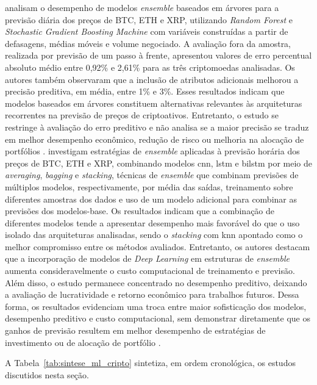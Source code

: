  analisam o desempenho de modelos \textit{ensemble} baseados em árvores para a previsão diária dos preços de BTC, ETH e XRP, utilizando \textit{Random Forest} e \textit{Stochastic Gradient Boosting Machine} com variáveis construídas a partir de defasagens, médias móveis e volume negociado. A avaliação fora da amostra, realizada por previsão de um passo à frente, apresentou valores de erro percentual absoluto médio entre 0,92\% e 2,61\% para as três criptomoedas analisadas. Os autores também observaram que a inclusão de atributos adicionais melhorou a precisão preditiva, em média, entre 1\% e 3\%. Esses resultados indicam que modelos baseados em árvores constituem alternativas relevantes às arquiteturas recorrentes na previsão de preços de criptoativos. Entretanto, o estudo se restringe à avaliação do erro preditivo e não analisa se a maior precisão se traduz em melhor desempenho econômico, redução de risco ou melhoria na alocação de portfólios \cite{derbentsev2021comparative}.  investigam estratégias de \textit{ensemble} aplicadas à previsão horária dos preços de BTC, ETH e XRP, combinando modelos \acs{cnn}, \acs{lstm} e \acs{bilstm} por meio de \textit{averaging}, \textit{bagging} e \textit{stacking}, técnicas de \textit{ensemble} que combinam previsões de múltiplos modelos, respectivamente, por média das saídas, treinamento sobre diferentes amostras dos dados e uso de um modelo adicional para combinar as previsões dos modelos-base. Os resultados indicam que a combinação de diferentes modelos tende a apresentar desempenho mais favorável do que o uso isolado das arquiteturas analisadas, sendo o \textit{stacking} com \acs{knn} apontado como o melhor compromisso entre os métodos avaliados. Entretanto, os autores destacam que a incorporação de modelos de \textit{Deep Learning} em estruturas de \textit{ensemble} aumenta consideravelmente o custo computacional de treinamento e previsão. Além disso, o estudo permanece concentrado no desempenho preditivo, deixando a avaliação de lucratividade e retorno econômico para trabalhos futuros. Dessa forma, os resultados evidenciam uma troca entre maior sofisticação dos modelos, desempenho preditivo e custo computacional, sem demonstrar diretamente que os ganhos de previsão resultem em melhor desempenho de estratégias de investimento ou de alocação de portfólio \cite{livieris2020ensemble}.

A Tabela~\ref{tab:sintese_ml_cripto} sintetiza, em ordem cronológica, os estudos discutidos nesta seção.

